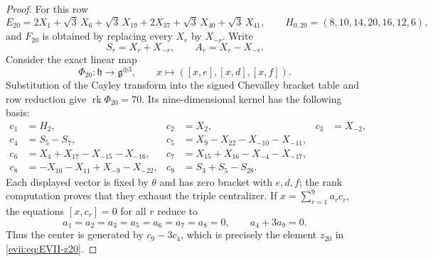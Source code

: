 \documentclass[10pt,a4paper]{amsart}
\numberwithin{equation}{section}
\newcommand{\rk}{\operatorname{rk}}
\newcommand{\fg}{\mathfrak g}
\newcommand{\fh}{\mathfrak h}
\begin{document}
\begin{proof}
For this row
\[
 E_{20}=2X_1+\sqrt3\,X_6+\sqrt3\,X_{19}+2X_{37}
          +\sqrt3\,X_{40}+\sqrt3\,X_{41},
 \qquad
 H_{0,20}=(8,10,14,20,16,12,6),
\]
and $F_{20}$ is obtained by replacing every $X_r$ by $X_{-r}$.
Write
\[
 S_r=X_r+X_{-r},\qquad A_r=X_r-X_{-r}.
\]
Consider the exact linear map
\[
 \Phi_{20}:\fh\longrightarrow\fg^{\oplus3},\qquad
 x\longmapsto([x,e],[x,d],[x,f]).
\]
Substitution of the Cayley transform into the signed Chevalley bracket table
and row reduction give $\rk\Phi_{20}=70$.  Its nine-dimensional kernel has the
following basis:
\begin{align*}
 c_1&=H_2,& c_2&=X_2,&c_3&=X_{-2},\\
 c_4&=S_5-S_7,
 &c_5&=X_9-X_{22}-X_{-10}-X_{-11},\\
 c_6&=X_4+X_{17}-X_{-15}-X_{-16},
 &c_7&=X_{15}+X_{16}-X_{-4}-X_{-17},\\
 c_8&=-X_{10}-X_{11}+X_{-9}-X_{-22},
 &c_9&=S_3+S_5-S_{28}.
\end{align*}
Each displayed vector is fixed by $\theta$ and has zero bracket with $e,d,f$;
the rank computation proves that they exhaust the triple centralizer.
If $x=\sum_{r=1}^9a_rc_r$, the equations $[x,c_r]=0$ for all $r$ reduce to
\[
 a_1=a_2=a_3=a_5=a_6=a_7=a_8=0,
 \qquad a_4+3a_9=0.
\]
Thus the center is generated by $c_9-3c_4$, which is precisely the element
$z_{20}$ in \eqref{evii:eq:EVII-z20}.


\end{proof}
\end{document}
